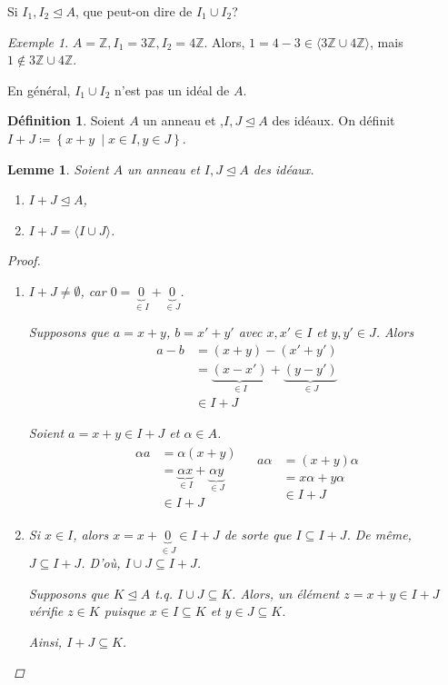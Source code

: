 \documentclass{report}
\newtheorem*{lem}{Lemme}
\theoremstyle{definition}
\newtheorem*{dfn}{D\'efinition}
\theoremstyle{remark}
\newtheorem*{exem}{Exemple}
\def\ZZ{\mathbb{Z}}
\begin{document}
	Si $I_1,I_2 \trianglelefteq A$, que peut-on dire de $I_1 \cup I_2$?
	\begin{exem}
		$A=\ZZ, I_1=3\ZZ, I_2=4\ZZ$. Alors, $1=4-3 \in \langle 3\ZZ \cup 4\ZZ \rangle$, mais $1 \notin 3\ZZ \cup 4\ZZ$.

		En g\'en\'eral, $I_1 \cup I_2$ n'est pas un id\'eal de $A$.
	\end{exem}

	\begin{dfn}
		Soient $A$ un anneau et ,$I,J \trianglelefteq A$ des id\'eaux. On d\'efinit $I+J \coloneq \left\{ x+y ~\middle| x\in I, y\in J \right\}$.
	\end{dfn}

	\begin{lem}
		Soient $A$ un anneau et $I,J \trianglelefteq A$ des id\'eaux.

		\begin{enumerate}
			\item $I+J \trianglelefteq A$,
			\item $I+J = \langle I \cup J \rangle$.
		\end{enumerate}
		\begin{proof}
			\begin{enumerate}
				\item $I+J \neq \emptyset$, car $0=\underbrace{0}_{\in I}+\underbrace{0}_{\in J}$.

				Supposons que $a=x+y$, $b=x'+y'$ avec $x,x'\in I$ et $y,y'\in J$. Alors
				\begin{align*}
					a-b&= (x+y)-(x'+y')\\
					&= \underbrace{(x-x')}_{\in I}+\underbrace{(y-y')}_{\in J}\\
					&\in I+J
				\end{align*}

				Soient $a=x+y\in I+J$ et $\alpha\in A$.
				\begin{align*}
					\begin{split}
						\alpha a&= \alpha(x+y)\\
						&= \underbrace{\alpha x}_{\in I}+\underbrace{\alpha y}_{\in J}\\
						&\in I+J
					\end{split}
					&
					\begin{split}
						a\alpha&= (x+y)\alpha\\
						&= x\alpha+y\alpha\\
						&\in I+J
					\end{split}
				\end{align*}
				\item Si $x\in I$, alors $x=x+\underbrace{0}_{\in J}\in I+J$ de sorte que $I\subseteq I+J$. De m\^eme, $J\subseteq I+J$. D'o\`u, $I \cup J \subseteq I+J$.

				Supposons que $K \trianglelefteq A$ t.q. $I\cup J\subseteq K$. Alors, un \'el\'ement $z=x+y\in I+J$ v\'erifie $z\in K$ puisque $x\in I\subseteq K$ et $y\in J\subseteq K$.

				Ainsi, $I+J\subseteq K$.
			\end{enumerate}
		\end{proof}
	\end{lem}
\end{document}
